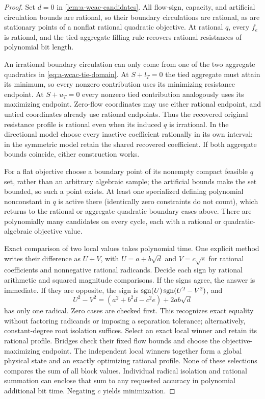 \begin{proof}
Set $d=0$ in \cref{lem:a-wcac-candidates}. All flow-sign, capacity, and
artificial circulation bounds are rational, so their boundary circulations
are rational, as are stationary points of a nonflat rational quadratic
objective. At rational $q$, every $f_e$ is rational, and the tied-aggregate
filling rule recovers rational resistances of polynomial bit length.

An irrational boundary circulation can only come from one of the two
aggregate quadratics in \eqref{eq:a-wcac-tie-domain}. At $S+l_T=0$ the
tied aggregate must attain its minimum, so every nonzero contribution
uses its minimizing resistance endpoint. At $S+u_T=0$ every nonzero tied
contribution analogously uses its maximizing endpoint. Zero-flow
coordinates may use either rational endpoint, and untied coordinates
already use rational endpoints. Thus the recovered original resistance
profile is rational even when its induced $q$ is irrational. In the
directional model choose every inactive coefficient rationally in its
own interval; in the symmetric model retain the shared recovered
coefficient. If both aggregate bounds coincide, either construction works.

For a flat objective choose a boundary point of its nonempty compact
feasible $q$ set, rather than an arbitrary algebraic sample; the
artificial bounds make the set bounded, so such a point exists. At least
one specialized defining polynomial nonconstant in $q$ is active there
(identically zero constraints do not count), which returns to the
rational or aggregate-quadratic boundary cases above. There are
polynomially many candidates on every cycle, each with a rational or
quadratic-algebraic objective value.

Exact comparison of two local values takes polynomial time. One explicit
method writes their difference as $U+V$, with
$U=a+b\sqrt d$ and $V=c\sqrt e$ for rational coefficients and nonnegative
rational radicands. Decide each sign by rational arithmetic and squared
magnitude comparisons. If the signs agree, the answer is immediate. If
they are opposite, the sign is $\operatorname{sgn}(U)\operatorname{sgn}(U^2-V^2)$, and
\[
 U^2-V^2=(a^2+b^2d-c^2e)+2ab\sqrt d
\]
has only one radical. Zero cases are checked first. This recognizes exact
equality without factoring radicands or imposing a separation tolerance;
alternatively, constant-degree root isolation suffices. Select an exact
local winner and retain its rational profile. Bridges check their fixed
flow bounds and choose the objective-maximizing endpoint. The independent
local winners together form a global physical state and an exactly
optimizing rational profile. None of these selections compares the sum of
all block values. Individual radical isolation and rational summation can
enclose that sum to any requested accuracy in polynomial additional bit
time. Negating $c$ yields minimization.
\end{proof}

